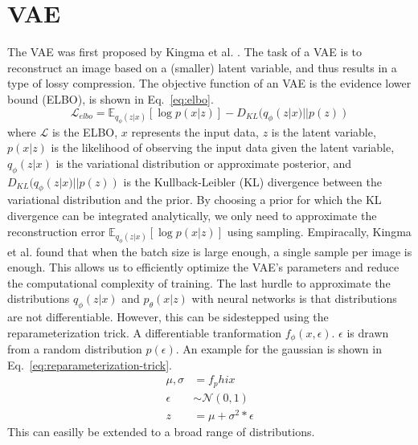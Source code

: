 \section{VAE}
The VAE was first proposed by Kingma et al. \cite{kingma2014autoencodingvariationalbayes}. The task of a VAE is to reconstruct an image based on a (smaller) latent variable, and thus results in a type of lossy compression. The objective function of an VAE is the evidence lower bound (ELBO), is shown in Eq.~\ref{eq:elbo}.
\begin{equation}
    \label{eq:elbo}
    \mathcal{L}_{elbo} = \mathbb{E}_{q_{\phi}(z|x)}[\log p(x|z)] - D_{KL}(q_{\phi}(z|x) || p(z))
\end{equation}
where $\mathcal{L}$ is the ELBO, $x$ represents the input data, $z$ is the latent variable, $p(x|z)$ is the likelihood of observing the input data given the latent variable, $q_\phi(z|x)$ is the variational distribution or approximate posterior, and $D_{KL}(q_{\phi}(z|x) || p(z))$ is the Kullback-Leibler (KL) divergence between the variational distribution and the prior. By choosing a prior for which the KL divergence can be integrated analytically, we only need to approximate the reconstruction error $\mathbb{E}_{q_{\phi}(z|x)}[\log p(x|z)]$ using sampling. Empiracally, Kingma et al. found that when the batch size is large enough, a single sample per image is enough. This allows us to efficiently optimize the VAE's parameters and reduce the computational complexity of training. The last hurdle to approximate the distributions $q_{\phi}(z | x)$ and $p_{\theta}(x | z)$ with neural networks is that distributions are not differentiable. However, this can be sidestepped using the reparameterization trick. A differentiable tranformation $f_\phi(x, \epsilon)$. $\epsilon$ is drawn from a random distribution $p(\epsilon)$. An example for the gaussian is shown in Eq.~\ref{eq:reparameterization-trick}.
\begin{equation}
    \begin{split}
        \mu, \sigma & = f_phi{x}                  \\
        \epsilon    & \sim \mathcal{N}(0, 1)      \\
        z           & = \mu + \sigma^2 * \epsilon
    \end{split}
    \label{eq:reparameterization-trick}
\end{equation}
This can easilly be extended to a broad range of distributions.

